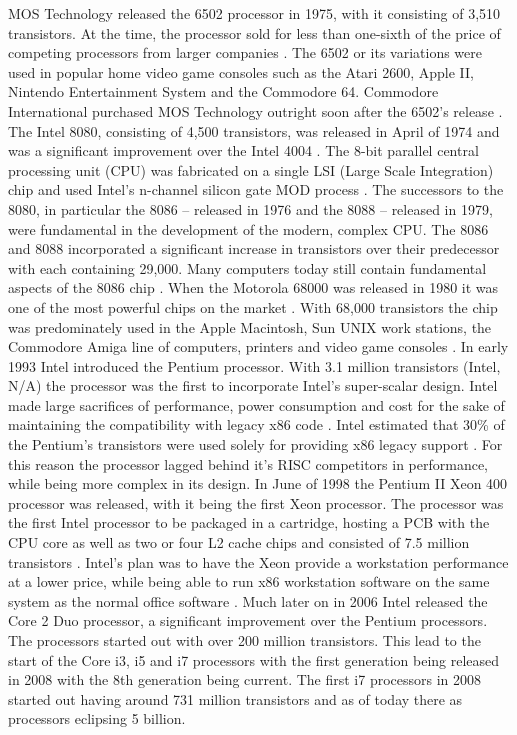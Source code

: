 MOS Technology released the 6502 processor in 1975, with it consisting of 3,510 transistors.
At the time, the processor sold for less than one-sixth of the price of competing processors from larger companies \cite{RN29}.
The 6502 or its variations were used in popular home video game consoles such as the Atari 2600, Apple II, Nintendo Entertainment System and the Commodore 64.
Commodore International purchased MOS Technology outright soon after the 6502’s release \cite{RN29}.
The Intel 8080, consisting of 4,500 transistors, was released in April of 1974 and was a significant improvement over the Intel 4004 \cite{RN8}.
The 8-bit parallel central processing unit (CPU) was fabricated on a single LSI (Large Scale Integration) chip and used Intel’s n-channel silicon gate MOD process \cite{RN10}.
The successors to the 8080, in particular the 8086 – released in 1976 and the 8088 – released in 1979, were fundamental in the development of the modern, complex CPU.
The 8086 and 8088 incorporated a significant increase in transistors over their predecessor with each containing 29,000.
Many computers today still contain fundamental aspects of the 8086 chip \cite{RN11}.  
When the Motorola 68000 was released in 1980 it was one of the most powerful chips on the market \cite{RN18}.
With 68,000 transistors the chip was predominately used in the Apple Macintosh, Sun UNIX work stations, the Commodore Amiga line of computers, printers and video game consoles \cite{RN18}. 
In early 1993 Intel introduced the Pentium processor.
With 3.1 million transistors  (Intel, N/A) the processor was the first to incorporate Intel’s super-scalar design.
Intel made large sacrifices of performance, power consumption and cost for the sake of maintaining the compatibility with legacy x86 code \cite{RN13}.
Intel estimated that 30\% of the Pentium’s transistors were used solely for providing x86 legacy support \cite{RN7}.
For this reason the processor lagged behind it’s RISC competitors in performance, while being more complex in its design.
In June of 1998 the Pentium II Xeon 400 processor was released, with it being the first Xeon processor.
The processor was the first Intel processor to be packaged in a cartridge, hosting a PCB with the CPU core as well as two or four L2 cache chips \cite{RN12} and consisted of 7.5 million transistors \cite{RN19}.
Intel’s plan was to have the Xeon provide a workstation performance at a lower price, while being able to run x86 workstation software on the same system as the normal office software \cite{RN12}.
Much later on in 2006 Intel released the Core 2 Duo processor, a significant improvement over the Pentium processors.
The processors started out with over 200 million transistors. 
This lead to the start of the Core i3, i5 and i7 processors with the first generation being released in 2008 with the 8th generation being current.
The first i7 processors in 2008 started out having around 731 million transistors and as of today there as processors eclipsing 5 billion.  

